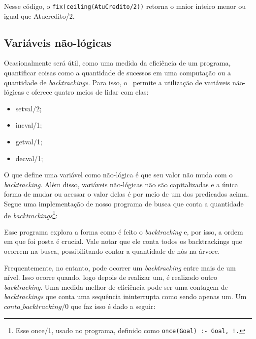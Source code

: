 \documentclass{article}
\begin{document}


Nesse código, o {\tt fix(ceiling(AtuCredito/2))} retorna o maior inteiro menor ou igual que Atucredito/2.

\subsection{Variáveis não-lógicas}

  Ocasionalmente será útil, como uma medida da eficiência de um programa, quantificar coisas como a quantidade de sucessos em uma computação ou a quantidade de \textit{backtrackings}. Para isso, o \eclipse\ permite a utilização de variáveis não-lógicas e oferece quatro meios de lidar com elas:

  \begin{itemize}
    \item setval/2;
    \item incval/1;
    \item getval/1;
    \item decval/1;
  \end{itemize}

  O que define uma variável como não-lógica é que seu valor não muda com o \textit{backtracking}. Além disso, variáveis não-lógicas não são capitalizadas e a única forma de mudar ou acessar o valor delas é por meio de um dos predicados acima. Segue uma implementação de nosso programa de busca que conta a quantidade de \textit{backtrackings}\footnote{Esse once/1, usado no programa, definido como {\tt once(Goal) :- Goal, !.}}:



Esse programa explora a forma como é feito o \textit{backtracking} e, por isso, a ordem em que foi posta é crucial. Vale notar que ele conta todos os backtrackings que ocorrem na busca, possibilitando contar a quantidade de nós na árvore.

Frequentemente, no entanto, pode ocorrer um \textit{backtracking} entre mais de um nível. Isso ocorre quando, logo depois de realizar um, é realizado outro \textit{backtracking}. Uma medida melhor de eficiência pode ser uma contagem de \textit{backtrackings} que conta uma sequência ininterrupta como sendo apenas um. Um $conta\_backtracking/0$ que faz isso é dado a seguir:


\end{document}
